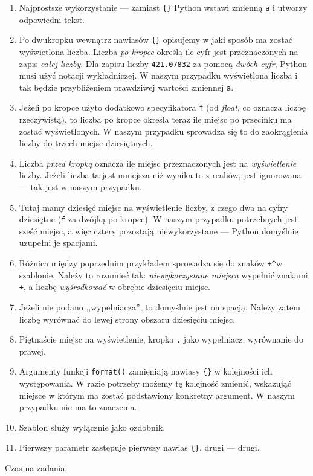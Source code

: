 \documentclass[a4paper]{article}
\begin{document}
\begin{enumerate}[label=\alph*)]
    \item Najprostsze wykorzystanie --- zamiast \verb|{}| Python wstawi zmienną \verb|a| i utworzy odpowiedni tekst.
    \item Po dwukropku wewnątrz nawiasów \verb|{}| opisujemy w jaki sposób ma zostać wyświetlona liczba. Liczba \emph{po kropce} określa ile cyfr jest przeznaczonych na zapis \emph{całej liczby}. Dla zapisu liczby \verb|421.07832| za pomocą \emph{dwóch cyfr}, Python musi użyć notacji wykładniczej. W naszym przypadku wyświetlona liczba i tak będzie przybliżeniem prawdziwej wartości zmiennej \verb|a|.
    \item Jeżeli po kropce użyto dodatkowo specyfikatora \verb|f| (od \emph{float}, co oznacza liczbę rzeczywistą), to liczba po kropce określa teraz ile miejsc po przecinku ma zostać wyświetlonych. W naszym przypadku sprowadza się to do zaokrąglenia liczby do trzech miejsc dziesiętnych.
    \item Liczba \emph{przed kropką} oznacza ile miejsc przeznaczonych jest na \emph{wyświetlenie} liczby. Jeżeli liczba ta jest mniejsza niż wynika to z realiów, jest ignorowana --- tak jest w naszym przypadku.
    \item Tutaj mamy dziesięć miejsc na wyświetlenie liczby, z czego dwa na cyfry dziesiętne (\verb|f| za dwójką po kropce). W naszym przypadku  potrzebnych jest sześć miejsc, a więc cztery pozostają niewykorzystane --- Python domyślnie uzupełni je spacjami.
    \item Różnica między poprzednim przykładem sprowadza się do znaków \verb|+^|w szablonie. Należy to rozumieć tak: \emph{niewykorzystane miejsca} wypełnić znakami \verb|+|, a liczbę \emph{wyśrodkować} w obrębie dziesięciu miejsc.
    \item Jeżeli nie podano ,,wypełniacza'', to domyślnie jest on spacją. Należy zatem liczbę wyrównać do lewej strony obszaru dziesięciu miejsc.
    \item Piętnaście miejsc na wyświetlenie, kropka \verb|.| jako wypełniacz, wyrównanie do prawej.
    \item Argumenty funkcji \verb|format()| zamieniają nawiasy \verb|{}| w kolejności ich występowania. W razie potrzeby możemy tę kolejność zmienić, wskazująć miejsce w którym ma zostać podstawiony konkretny argument. W naszym przypadku nie ma to znaczenia.
    \item Szablon służy wyłącznie jako ozdobnik.
    \item Pierwszy parametr zastępuje pierwszy nawias \verb|{}|, drugi --- drugi.
\end{enumerate}
Czas na zadania.
\end{document}
